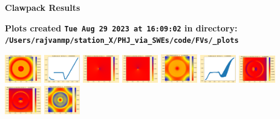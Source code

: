 \documentclass[11pt]{article}
\begin{document}
        \begin{center}{\Large\bf Clawpack Results}\vskip 5pt
        
        \bf Plots created {\tt Tue Aug 29 2023 at 16:09:02} in directory: \vskip 5pt
        \verb+/Users/rajvanmp/station_X/PHJ_via_SWEs/code/FVs/_plots+
        \end{center}
        \vskip 5pt
        \includegraphics[width=0.11875\textwidth]{frame0000fig0.png}
\includegraphics[width=0.11875\textwidth]{frame0000fig1.png}
\includegraphics[width=0.11875\textwidth]{frame0000fig2.png}
\includegraphics[width=0.11875\textwidth]{frame0000fig3.png}
\includegraphics[width=0.11875\textwidth]{frame0001fig0.png}
\includegraphics[width=0.11875\textwidth]{frame0001fig1.png}
\includegraphics[width=0.11875\textwidth]{frame0001fig2.png}
\includegraphics[width=0.11875\textwidth]{frame0001fig3.png}
\vskip 10pt 
\includegraphics[width=0.11875\textwidth]{frame0002fig0.png}
\end{document}
